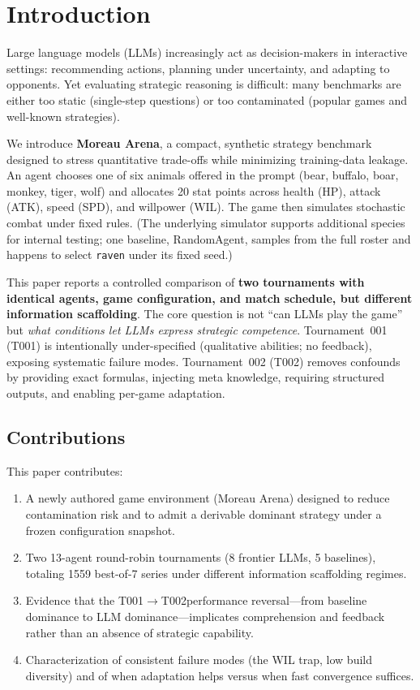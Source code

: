 \documentclass[11pt]{article}
\newcommand{\tOne}{T001}
\newcommand{\tTwo}{T002}
\begin{document}
\section{Introduction}

Large language models (LLMs) increasingly act as decision-makers in interactive settings: recommending actions, planning under uncertainty, and adapting to opponents.
Yet evaluating strategic reasoning is difficult: many benchmarks are either too static (single-step questions) or too contaminated (popular games and well-known strategies).

We introduce \textbf{Moreau Arena}, a compact, synthetic strategy benchmark designed to stress quantitative trade-offs while minimizing training-data leakage.
An agent chooses one of six animals offered in the prompt (bear, buffalo, boar, monkey, tiger, wolf) and allocates 20 stat points across health (HP), attack (ATK), speed (SPD), and willpower (WIL).
The game then simulates stochastic combat under fixed rules.
(The underlying simulator supports additional species for internal testing; one baseline, RandomAgent, samples from the full roster and happens to select \texttt{raven} under its fixed seed.)

This paper reports a controlled comparison of \textbf{two tournaments with identical agents, game configuration, and match schedule, but different information scaffolding}.
The core question is not ``can LLMs play the game'' but \emph{what conditions let LLMs express strategic competence}.
Tournament~001 (\tOne) is intentionally under-specified (qualitative abilities; no feedback), exposing systematic failure modes.
Tournament~002 (\tTwo) removes confounds by providing exact formulas, injecting meta knowledge, requiring structured outputs, and enabling per-game adaptation.

\subsection*{Contributions}

This paper contributes:
\begin{enumerate}[leftmargin=*]
\item A newly authored game environment (Moreau Arena) designed to reduce contamination risk and to admit a derivable dominant strategy under a frozen configuration snapshot.
\item Two 13-agent round-robin tournaments (8 frontier LLMs, 5 baselines), totaling 1559 best-of-7 series under different information scaffolding regimes.
\item Evidence that the \tOne$\to$\tTwo performance reversal---from baseline dominance to LLM dominance---implicates comprehension and feedback rather than an absence of strategic capability.
\item Characterization of consistent failure modes (the WIL trap, low build diversity) and of when adaptation helps versus when fast convergence suffices.
\end{enumerate}
\end{document}
